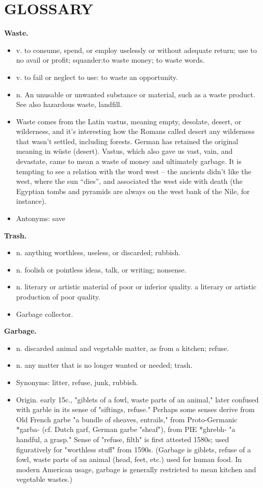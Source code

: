 \chapter{GLOSSARY}

\noindent\textbf{Waste.}
\begin{itemize}
\item v. to consume, spend, or employ uselessly or without adequate return; use to no avail or profit; squander:to waste money; to waste words.
\item v. to fail or neglect to use: to waste an opportunity.
\item n. An unusable or unwanted substance or material, such as a waste product. See also hazardous waste, landfill. 
\item Waste comes from the Latin vastus, meaning empty, desolate, desert, or wilderness, and it’s interesting how the Romans called desert any wilderness that wasn’t settled, including forests.  German has retained the original meaning in wüste (desert). Vastus, which also gave us vast, vain, and devastate, came to mean a waste of money and ultimately garbage.  It is tempting to see a relation with the word west – the ancients didn’t like the west, where the sun “dies”, and associated the west side with death (the Egyptian tombs and pyramids are always on the west bank of the Nile, for instance)\cite{paul2013garbage}.
\item Antonyms: save
\end{itemize}

\noindent\textbf{Trash.}
\begin{itemize}
\item n. anything worthless, useless, or discarded; rubbish.
\item n. foolish or pointless ideas, talk, or writing; nonsense.
\item n. literary or artistic material of poor or inferior quality. a literary or artistic production of poor quality.
\item Garbage collector.
\end{itemize}

\noindent\textbf{Garbage.}
\begin{itemize}
\item n. discarded animal and vegetable matter, as from a kitchen; refuse.
\item n. any matter that is no longer wanted or needed; trash.
\item Synonyms: litter, refuse, junk, rubbish.
\item Origin. early 15c., "giblets of a fowl, waste parts of an animal," later confused with garble in its sense of "siftings, refuse." Perhaps some senses derive from Old French garbe "a bundle of sheaves, entrails," from Proto-Germanic *garba- (cf. Dutch garf, German garbe "sheaf"), from PIE *ghrebh- "a handful, a grasp." Sense of "refuse, filth" is first attested 1580s; used figuratively for "worthless stuff" from 1590s. (Garbage is giblets, refuse of a fowl, waste parts of an animal (head, feet, etc.) used for human food. In modern American usage, garbage is generally restricted to mean kitchen and vegetable wastes.)
\end{itemize}

